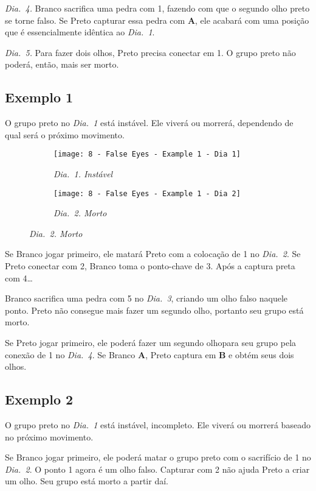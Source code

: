 \emph{Dia.\@~4.} Branco sacrifica uma pedra com 1, fazendo com que o segundo olho preto se torne falso. Se Preto capturar essa pedra com \textbf{A}, ele acabará com uma posição que é essencialmente idêntica ao \emph{Dia.\@~1}.

\emph{Dia.\@~5.} Para fazer dois olhos, Preto precisa conectar em 1. O grupo preto não poderá, então, mais ser morto.

\subsection{Exemplo 1}

O grupo preto no \emph{Dia.\@~1} está instável. Ele viverá ou morrerá, dependendo de qual será o próximo movimento.

\begin{figure}[h!]
    \centering
    \begin{subfigure}[t]{.31\textwidth}
        \texttt{[image: 8 - False Eyes - Example 1 - Dia 1]}
        \caption*{\emph{Dia.\@~1. Instável}}
    \end{subfigure}
    \hspace{1cm}
    \begin{subfigure}[t]{.31\textwidth}
        \texttt{[image: 8 - False Eyes - Example 1 - Dia 2]}
        \caption*{\emph{Dia.\@~2. Morto}}
    \end{subfigure}
\end{figure}

Se Branco jogar primeiro, ele matará Preto com a colocação de 1 no \emph{Dia.\@~2}. Se Preto conectar com 2, Branco toma o ponto-chave de 3. Após a captura preta com 4\ldots

Branco sacrifica uma pedra com 5 no \emph{Dia.\@~3}, criando um olho falso naquele ponto. Preto não consegue mais fazer um segundo olho, portanto seu grupo está morto.

Se Preto jogar primeiro, ele poderá fazer um segundo olhopara seu grupo pela conexão de 1 no \emph{Dia.\@~4}. Se Branco \textbf{A}, Preto captura em \textbf{B} e obtém seus dois olhos.

\subsection{Exemplo 2}

O grupo preto no \emph{Dia.\@~1} está instável, incompleto. Ele viverá ou morrerá baseado no próximo movimento.

Se Branco jogar primeiro, ele poderá matar o grupo preto com o sacrifício de 1 no \emph{Dia.\@~2}. O ponto 1 agora é um olho falso. Capturar com 2 não ajuda Preto a criar um olho. Seu grupo está morto a partir daí.

